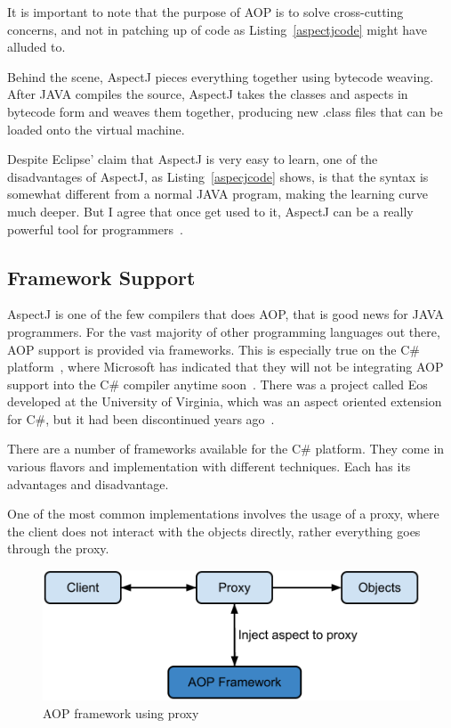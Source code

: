 It is important to note that the purpose of AOP is to solve cross-cutting concerns, and not in patching up of code as Listing~\ref{aspectjcode} might have alluded to.

Behind the scene, AspectJ pieces everything together using bytecode weaving. After JAVA compiles the source, AspectJ takes the classes and aspects in bytecode form and weaves them together, producing new .class files that can be loaded onto the virtual machine.

Despite Eclipse' claim that AspectJ is very easy to learn, one of the disadvantages of AspectJ, as Listing~\ref{aspecjcode} shows, is that the syntax is somewhat different from a normal JAVA program, making the learning curve much deeper. But I agree that once get used to it, AspectJ can be a really powerful tool for programmers~\cite{aspectj_text}.

\subsection{Framework Support}

AspectJ is one of the few compilers that does AOP, that is good news for JAVA programmers. For the vast majority of other programming languages out there, AOP support is provided via frameworks. This is especially true on the C\# platform~\cite{aopcs}, where Microsoft has indicated that they will not be integrating AOP support into the C\# compiler anytime soon~\cite{mastermind_text}. There was a project called Eos developed at the University of Virginia, which was an aspect oriented extension for C\#, but it had been discontinued years ago~\cite{eos_site, eos}.

There are a number of frameworks available for the C\# platform. They come in various flavors and implementation with different techniques. Each has its advantages and disadvantage.

One of the most common implementations involves the usage of a proxy, where the client does not interact with the objects directly, rather everything goes through the proxy.

\begin{figure}[here]
  \includegraphics[scale=0.70]{proxy.png}
  \centering
  \caption{AOP framework using proxy\label{proxy_model}}
\end{figure}

